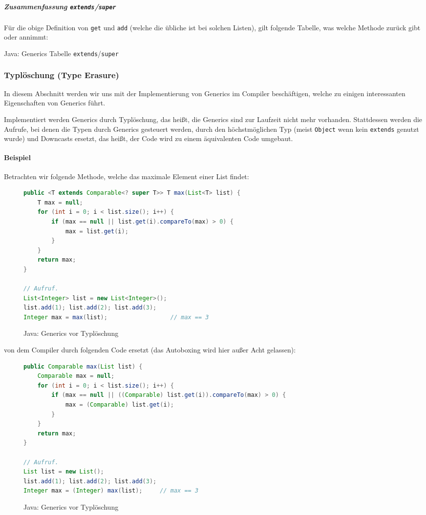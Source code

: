 			\subparagraph{Zusammenfassung \texttt{extends}/\texttt{super}}
				Für die obige Definition von \texttt{get} und \texttt{add} (welche die übliche ist bei solchen Listen), gilt folgende Tabelle, was welche Methode zurück gibt oder annimmt:
				\begin{table}[H]
					\centering
					\caption{Java: Generics Tabelle \texttt{extends}/\texttt{super}}
				\end{table}
	
	\subsubsection{Typlöschung (Type Erasure)}
		In diesem Abschnitt werden wir uns mit der Implementierung von Generics im Compiler beschäftigen, welche zu einigen interessanten Eigenschaften von Generics führt.
		
		Implementiert werden Generics durch Typlöschung, das heißt, die Generics sind zur Laufzeit nicht mehr vorhanden. Stattdessen werden die Aufrufe, bei denen die Typen durch Generics gesteuert werden, durch den höchstmöglichen Typ (meist \texttt{Object} wenn kein \texttt{extends} genutzt wurde) und Downcasts ersetzt, das heißt, der Code wird zu einem äquivalenten Code umgebaut.
		
		\paragraph{Beispiel}
			Betrachten wir folgende Methode, welche das maximale Element einer List findet:
			\begin{figure}[H]
				\centering
				\begin{lstlisting}[language = Java]
public <T extends Comparable<? super T>> T max(List<T> list) {
	T max = null;
	for (int i = 0; i < list.size(); i++) {
		if (max == null || list.get(i).compareTo(max) > 0) {
			max = list.get(i);
		}
	}
	return max;
}

// Aufruf.
List<Integer> list = new List<Integer>();
list.add(1); list.add(2); list.add(3);
Integer max = max(list);                  // max == 3
				\end{lstlisting}
				\caption{Java: Generics vor Typlöschung}
			\end{figure}
			von dem Compiler durch folgenden Code ersetzt (das Autoboxing wird hier außer Acht gelassen):
			\begin{figure}[H]
				\centering
				\begin{lstlisting}[language = Java]
public Comparable max(List list) {
	Comparable max = null;
	for (int i = 0; i < list.size(); i++) {
		if (max == null || ((Comparable) list.get(i)).compareTo(max) > 0) {
			max = (Comparable) list.get(i);
		}
	}
	return max;
}

// Aufruf.
List list = new List();
list.add(1); list.add(2); list.add(3);
Integer max = (Integer) max(list);     // max == 3
				\end{lstlisting}
				\caption{Java: Generics vor Typlöschung}
			\end{figure}
	
